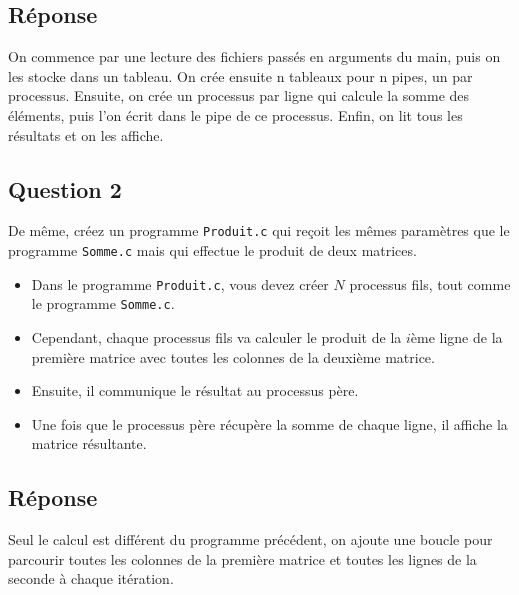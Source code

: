 \documentclass[
	12pt, %
]{fphw}
\begin{document}
\subsection*{Réponse}

On commence par une lecture des fichiers passés en arguments du main, puis on les stocke dans un tableau.
On crée ensuite n tableaux pour n pipes, un par processus.
Ensuite, on crée un processus par ligne qui calcule la somme des éléments, puis l'on écrit dans le pipe de ce processus.
Enfin, on lit tous les résultats et on les affiche.

\newpage
\subsection*{Question 2}
\begin{problem}
De même, créez un programme \texttt{Produit.c} qui reçoit les mêmes paramètres que le programme \texttt{Somme.c} mais qui effectue le produit de deux matrices. 
\begin{itemize}
	\item Dans le programme \texttt{Produit.c}, vous devez créer $N$ processus fils, tout comme le programme \texttt{Somme.c}.
	\item Cependant, chaque processus fils va calculer le produit de la $i$ème ligne de la première matrice avec toutes les colonnes de la deuxième matrice.
	\item Ensuite, il communique le résultat au processus père.
	\item Une fois que le processus père récupère la somme de chaque ligne, il affiche la matrice résultante.
\end{itemize}
\end{problem}
\subsection*{Réponse}

Seul le calcul est différent du programme précédent, on ajoute une boucle pour parcourir toutes les colonnes de la première matrice et toutes les lignes de la seconde à chaque itération.

\newpage
\end{document}
